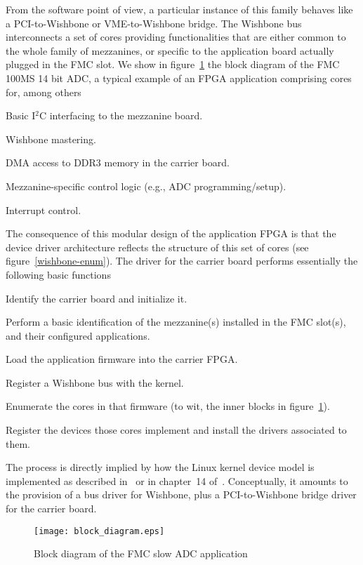 \documentclass{JAC2003}
\begin{document}
From the software
point of view, a particular instance of this family behaves like a
PCI-to-Wishbone or VME-to-Wishbone bridge. The Wishbone bus
interconnects a set of cores providing functionalities that are either
common to the whole family of mezzanines, or specific to the application
board actually plugged in the FMC slot. We show in figure~\ref{slow-adc}
the block diagram of the FMC 100MS 14 bit ADC,
a typical example of an FPGA application comprising cores for, among
others
\begin{Itemize}
\item Basic I${}^2$C interfacing to the mezzanine board.
\item Wishbone mastering.
\item DMA access to DDR3 memory in the carrier board.
\item Mezzanine-specific control logic (e.g., ADC programming/setup).
\item Interrupt control.
\end{Itemize}
The consequence of this modular design of the application FPGA is that
the device driver architecture reflects the structure of this set of
cores (see figure~\ref{wishbone-enum}). The driver for the carrier board
performs essentially the following basic functions
\begin{Itemize}
\item Identify the carrier board and initialize it.
\item Perform a basic identification of the mezzanine(s) installed in
    the FMC slot(s), and their configured applications.
\item Load the application firmware into the carrier FPGA.
\item Register a Wishbone bus with the kernel.
\item Enumerate the cores in that firmware (to wit, the
    inner blocks in figure~\ref{slow-adc}).
\item Register the devices those cores implement and install the drivers
    associated to them.
\end{Itemize}
The process is directly implied by how the Linux kernel device
model is implemented as described in~\cite{device-model} or in chapter~14
of~\cite{rubini}. Conceptually, it amounts to the provision of a bus driver
for Wishbone, plus a PCI-to-Wishbone bridge driver for the
carrier board.

\begin{figure}[t]
   \centering
   \texttt{[image: block\_diagram.eps]}
   \caption{Block diagram of the FMC slow ADC application}
   \label{slow-adc}
\end{figure}
\end{document}
